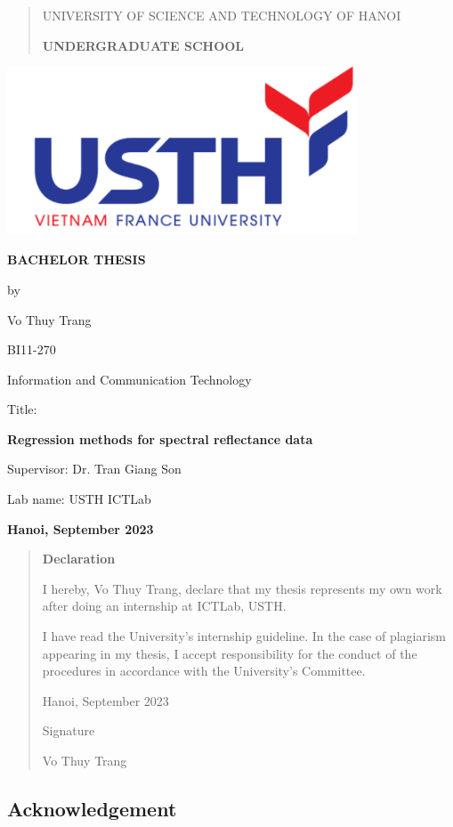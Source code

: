 \documentclass[
]{article}
\author{}
\date{}
\begin{document}
\begin{quote}
UNIVERSITY OF SCIENCE AND TECHNOLOGY OF HANOI

\textbf{UNDERGRADUATE SCHOOL}
\end{quote}

\includegraphics[width=4.09597in,height=1.96396in]{vertopal_f239f640fefe43bb8bc0698cafd57825/media/image5.png}

\textbf{BACHELOR THESIS}

by

Vo Thuy Trang

BI11-270

Information and Communication Technology

Title:

\textbf{Regression methods for spectral reflectance data}

Supervisor: Dr. Tran Giang Son

Lab name: USTH ICTLab

\textbf{Hanoi, September 2023}

\begin{quote}
\textbf{Declaration}

I hereby, Vo Thuy Trang, declare that my thesis represents my own work
after doing an internship at ICTLab, USTH.

I have read the University's internship guideline. In the case of
plagiarism appearing in my thesis, I accept responsibility for the
conduct of the procedures in accordance with the University's Committee.

Hanoi, September 2023

Signature

Vo Thuy Trang
\end{quote}

\hypertarget{acknowledgement}{%
\subsection{\texorpdfstring{\textbf{Acknowledgement}}{Acknowledgement}}\label{acknowledgement}}
\end{document}

